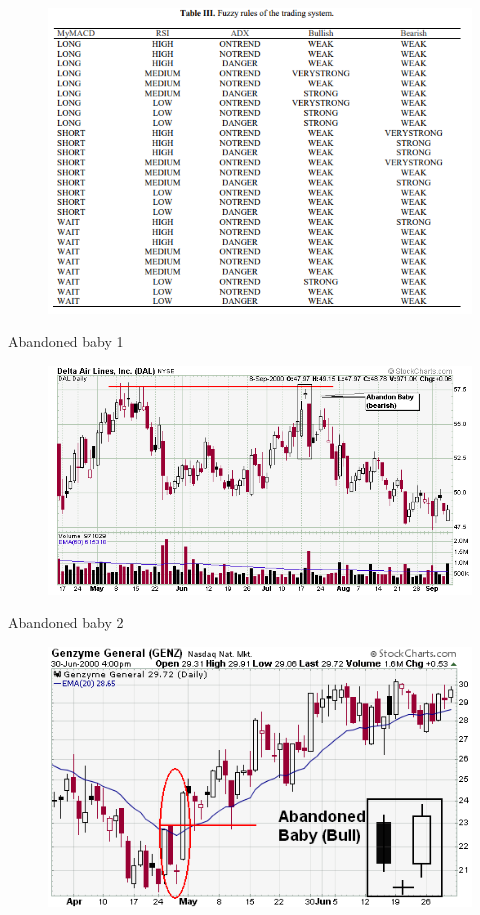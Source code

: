 \documentclass{beamer}
\begin{document}
\begin{frame}{}
\begin{figure}[h]
  \includegraphics[width=\textwidth]{img/fuzzy_rules.PNG}
\end{figure}
\end{frame}

\begin{frame}{Abandoned baby 1}
\begin{figure}[h]
  \includegraphics[width=\textwidth]{img/baby1.PNG}
\end{figure}
\end{frame}

\begin{frame}{Abandoned baby 2}
\begin{figure}[h]
  \includegraphics[width=\textwidth]{img/baby2.png}
\end{figure}
\end{frame}
\end{document}
